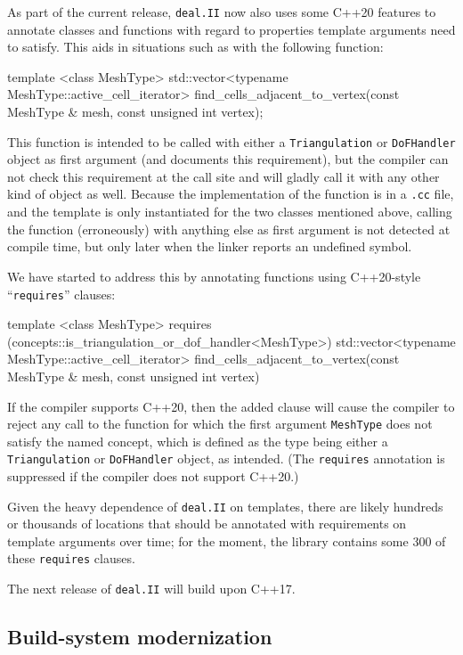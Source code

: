 \documentclass{ansarticle-preprint}
\newcommand{\specialword}[1]{\texttt{#1}}
\newcommand{\dealii}{{\specialword{deal.II}}\xspace}
\begin{document}
As part of the current release, \dealii{} now also uses some C++20
features to annotate classes and functions with regard to properties
template arguments need to satisfy. This aids in situations such as
with the
following function:
\begin{c++}
template <class MeshType>
std::vector<typename MeshType::active_cell_iterator>
find_cells_adjacent_to_vertex(const MeshType &   mesh,
                              const unsigned int vertex);
\end{c++}
This function is intended to be called with either a
\texttt{Triangulation} or \texttt{DoFHandler} object as first
argument (and documents this requirement), but the compiler can not check this requirement at the call
site and will gladly call it with any other kind of object as
well. Because the implementation of the function is in a \texttt{.cc}
file, and the template is only instantiated for the two classes
mentioned above, calling the function (erroneously) with anything else
as first argument is not detected at compile time, but only later when
the linker reports an undefined symbol.

We have started to address this by annotating functions using
C++20-style ``\texttt{requires}'' clauses:
\begin{c++}
template <class MeshType>
  requires (concepts::is_triangulation_or_dof_handler<MeshType>)
std::vector<typename MeshType::active_cell_iterator>
find_cells_adjacent_to_vertex(const MeshType &   mesh,
                              const unsigned int vertex)
\end{c++}
If the compiler supports C++20, then the added clause will cause the
compiler to reject any call to the function for which the first
argument \texttt{MeshType} does not satisfy the named concept, which
is defined as the type being either a \texttt{Triangulation} or \texttt{DoFHandler}
object, as intended. (The \texttt{requires} annotation is suppressed if the compiler
does not support C++20.)

Given the heavy dependence of \dealii{} on templates, there are likely
hundreds or thousands of locations that should be annotated with
requirements on template arguments over time; for the moment, the
library contains some 300 of these \texttt{requires} clauses.

The next release of \dealii{} will build upon C++17.


\subsection{Build-system modernization}\label{sec:buildsystem}
\end{document}
